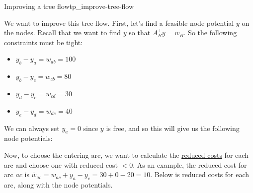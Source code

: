 \begin{example}{Improving a tree flow}{tp_improve-tree-flow}
\begin{minipage}{0.5\textwidth}
  \end{minipage}

  We want to improve this tree flow. First, let's find a feasible node potential $y$ on the nodes. Recall that we want to find $y$ so that $A^\intercal_B y = w_B$. So the following constraints must be tight:
  \begin{itemize}
    \item $y_b - y_a = w_{ab} = 100$
    \item $y_b - y_c = w_{cb} = 80$
    \item $y_d - y_c = w_{cd} = 30$
    \item $y_e - y_d = w_{de} = 40$
  \end{itemize}
  We can always set $y_a = 0$ since $y$ is free, and so this will give us the following node potentials: 

  \begin{minipage}{\textwidth}
    \centering
  \end{minipage}

  Now, to choose the entering arc, we want to calculate the \underline{reduced costs} for each arc and choose one with reduced cost $<0$. As an example, the reduced cost for arc $ac$ is $\bar{w}_{ac} = w_{ac} + y_a - y_c = 30 + 0 - 20 = 10$. Below is reduced costs for each arc, along with the node potentials.
  
  \begin{minipage}{\textwidth}
    \centering
\end{minipage}
\end{example}

